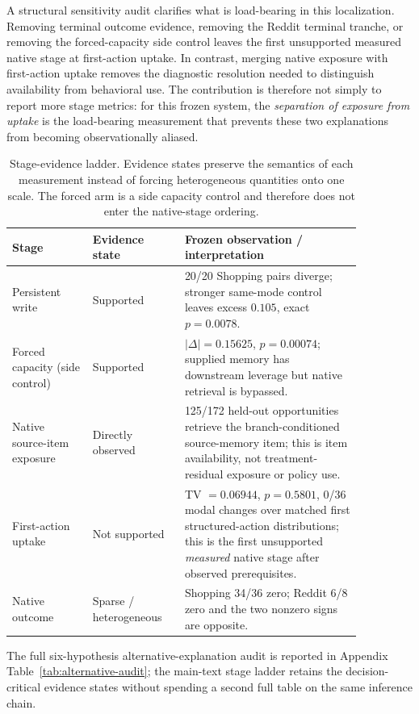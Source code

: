 A structural sensitivity audit clarifies what is load-bearing in this localization. Removing terminal outcome evidence, removing the Reddit terminal tranche, or removing the forced-capacity side control leaves the first unsupported measured native stage at first-action uptake. In contrast, merging native exposure with first-action uptake removes the diagnostic resolution needed to distinguish availability from behavioral use. The contribution is therefore not simply to report more stage metrics: for this frozen system, the \emph{separation of exposure from uptake} is the load-bearing measurement that prevents these two explanations from becoming observationally aliased.

\begin{table}[t]
\centering
\small
\caption{Stage-evidence ladder. Evidence states preserve the semantics of each measurement instead of forcing heterogeneous quantities onto one scale. The forced arm is a side capacity control and therefore does not enter the native-stage ordering.}
\label{tab:evidence-ladder}
\begin{tabular}{@{}p{0.20\linewidth}p{0.22\linewidth}p{0.44\linewidth}@{}}
\toprule
Stage & Evidence state & Frozen observation / interpretation \\
\midrule
Persistent write & Supported & 20/20 Shopping pairs diverge; stronger same-mode control leaves excess $0.105$, exact $p=0.0078$. \\
Forced capacity (side control) & Supported & $|\Delta|=0.15625$, $p=0.00074$; supplied memory has downstream leverage but native retrieval is bypassed. \\
Native source-item exposure & Directly observed & 125/172 held-out opportunities retrieve the branch-conditioned source-memory item; this is item availability, not treatment-residual exposure or policy use. \\
First-action uptake & Not supported & TV $=0.06944$, $p=0.5801$, 0/36 modal changes over matched first structured-action distributions; this is the first unsupported \emph{measured} native stage after observed prerequisites. \\
Native outcome & Sparse / heterogeneous & Shopping 34/36 zero; Reddit 6/8 zero and the two nonzero signs are opposite. \\
\bottomrule
\end{tabular}
\end{table}

The full six-hypothesis alternative-explanation audit is reported in Appendix Table~\ref{tab:alternative-audit}; the main-text stage ladder retains the decision-critical evidence states without spending a second full table on the same inference chain.

